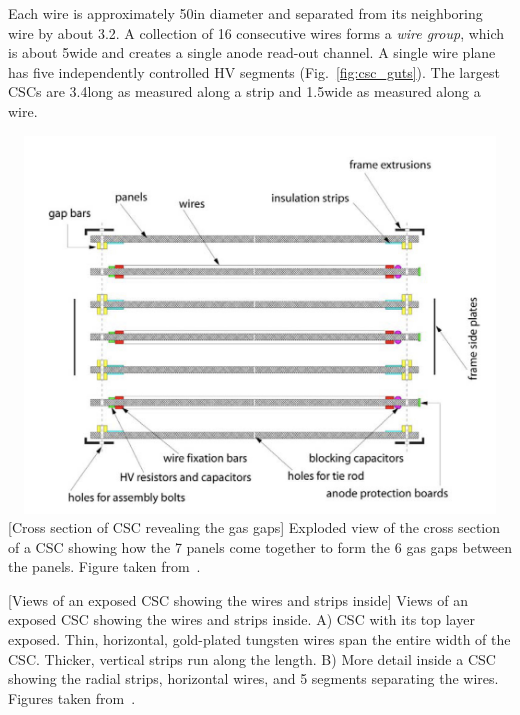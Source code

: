 Each wire is approximately 50\mum in diameter and separated from its neighboring wire by about 3.2\mm.
A collection of 16 consecutive wires forms a \emph{wire group}, which is about 5\cm wide and creates a single anode read-out channel.
A single wire plane has five independently controlled HV segments (Fig.~\ref{fig:csc_guts}).
The largest CSCs are 3.4\meter long as measured along a strip and 1.5\meter wide as measured along a wire.
\begin{multiFigure}
    \centering
    \includegraphics[width=15cm,height=10cm,keepaspectratio]{figures/cms/muonsys/csc_separatedlayers.jpeg}
        [Cross section of CSC revealing the gas gaps]
        {Exploded view of the cross section of a CSC showing how the 7 panels come together to form the 6 gas gaps between the panels.
        Figure taken from~\cite{PhysRevLett.114.191803}. %
        }
    \label{fig:csc_separatelayers}
\end{multiFigure}
\begin{multiFigure}
    \centering
        [Views of an exposed CSC showing the wires and strips inside]
        {Views of an exposed CSC showing the wires and strips inside.
        \;A) CSC with its top layer exposed.
        Thin, horizontal, gold-plated tungsten wires span the entire width of the CSC. 
        Thicker, vertical strips run along the length.
        \;B) More detail inside a CSC showing the radial strips, horizontal wires, and 5 segments separating the wires.
        Figures taken from~\cite{PhysRevLett.114.191803}. %
        }
    \label{fig:csc_guts}
\end{multiFigure}

